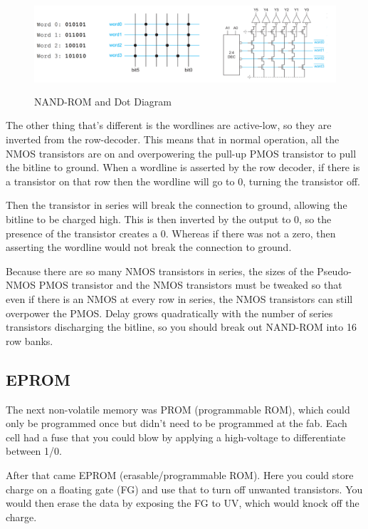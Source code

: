 \documentclass{article}
\begin{document}
\begin{figure}[ht!]
\centering
\includegraphics[height=35mm]{NANDROM.png}
\caption{NAND-ROM and Dot Diagram}
\end{figure}


The other thing that's different is the wordlines are active-low, so they are inverted from the row-decoder. This means that in normal operation, all the NMOS transistors are on and overpowering the pull-up PMOS transistor to pull the bitline to ground. When a wordline is asserted by  the row decoder, if there is a transistor on that row then the wordline will go to 0, turning the transistor off. 

Then the transistor in series will break the connection to ground, allowing the bitline to be charged high. This is then inverted by the output to 0, so the presence of the transistor creates a 0. Whereas if there was not a zero, then asserting the wordline would not break the connection to ground.

Because there are so many NMOS transistors in series, the sizes of the Pseudo-NMOS PMOS transistor and the NMOS transistors must be tweaked so that even if there is an NMOS at every row in series, the NMOS transistors can still overpower the PMOS. Delay grows quadratically with the number of series transistors discharging the bitline, so you should break out NAND-ROM into 16 row banks. 

\subsection{EPROM}

The next non-volatile memory was PROM (programmable ROM), which could only be programmed once but didn't need to be programmed at the fab. Each cell had a fuse that you could blow by applying a high-voltage to differentiate between 1/0. 

After that came EPROM (erasable/programmable ROM). Here you could store charge on a floating gate (FG) and use that to turn off unwanted transistors. You would then erase the data by exposing the FG to UV, which would knock off the charge.
\end{document}
